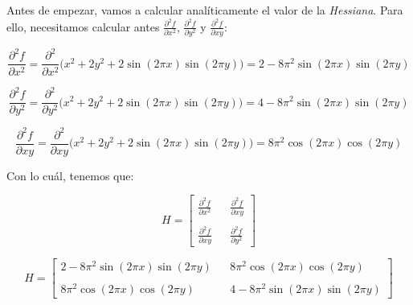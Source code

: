 \documentclass[11pt,a4paper]{article}
\begin{document}
Antes de empezar, vamos a calcular analíticamente el valor de la \textit{Hessiana}. Para ello, necesitamos calcular antes
$\frac{\partial^2 f}{\partial x^2}$, $\frac{\partial^2 f}{\partial y^2}$ y $\frac{\partial^2 f}{\partial xy}$:

\begin{equation}
\frac{\partial^2 f}{\partial x^2} = \frac{\partial^2}{\partial x^2} \Big(x^2 + 2y^2 + 2\sin(2 \pi x)\sin(2 \pi y)\Big) =
2 - 8 \pi ^ 2 \sin(2 \pi x)\sin(2 \pi y)
\end{equation}

\begin{equation}
\frac{\partial^2 f}{\partial y^2} = \frac{\partial^2}{\partial y^2} \Big(x^2 + 2y^2 + 2\sin(2 \pi x)\sin(2 \pi y)\Big) =
4 - 8 \pi ^ 2 \sin(2 \pi x)\sin(2 \pi y)
\end{equation}

\begin{equation}
\frac{\partial^2 f}{\partial xy} = \frac{\partial^2}{\partial xy} \Big(x^2 + 2y^2 + 2\sin(2 \pi x)\sin(2 \pi y)\Big) =
8 \pi ^ 2 \cos(2 \pi x)\cos(2 \pi y)
\end{equation}

Con lo cuál, tenemos que:

\begin{equation}
H =
\left[
{
\begin{array}{ccc}
	\frac{\partial^2 f}{\partial x^2} & & \frac{\partial^2 f}{\partial xy} \\
	\\
	\frac{\partial^2 f}{\partial xy} & & \frac{\partial^2 f}{\partial y^2}
\end{array}
}
\right]
\end{equation}

\begin{equation}
H =
\left[
{
\begin{array}{ccc}
	2 - 8 \pi ^ 2 \sin(2 \pi x)\sin(2 \pi y) & & 8 \pi ^ 2 \cos(2 \pi x)\cos(2 \pi y) \\
	\\
	8 \pi ^ 2 \cos(2 \pi x)\cos(2 \pi y) & & 4 - 8 \pi ^ 2 \sin(2 \pi x)\sin(2 \pi y)
\end{array}
}
\right]
\end{equation}
\end{document}
